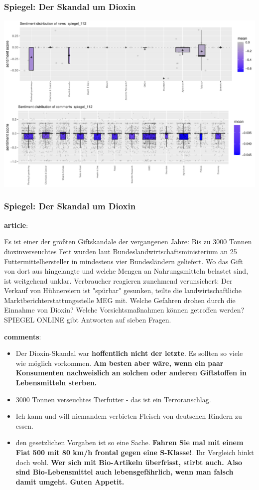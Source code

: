 \documentclass{tum-presentation}
\begin{document}
\begin{frame}
  \frametitle{Spiegel: Der Skandal um Dioxin }
  \includegraphics[width =0.65 \textwidth]{figures/boxplot_spiegel_112.pdf}
  
\end{frame}
\begin{frame}
  \frametitle{ Spiegel: Der Skandal um Dioxin }
  \begin{description}
    \item \textbf{article}:
    \item Es ist einer der größten Giftskandale der vergangenen Jahre: Bis zu 3000 Tonnen dioxinverseuchtes Fett wurden laut Bundeslandwirtschaftsministerium an 25 Futtermittelhersteller in mindestens vier Bundesländern geliefert. Wo das Gift von dort aus hingelangte und welche Mengen an Nahrungsmitteln belastet sind, ist weitgehend unklar. Verbraucher reagieren zunehmend verunsichert: Der Verkauf von Hühnereiern ist "spürbar" gesunken, teilte die landwirtschaftliche Marktberichterstattungsstelle MEG mit. Welche Gefahren drohen durch die Einnahme von Dioxin? Welche Vorsichtsmaßnahmen können getroffen werden? SPIEGEL ONLINE gibt Antworten auf sieben Fragen.
    \item \textbf{comments}:
    \item  \begin{itemize}
      \item  Der Dioxin-Skandal war  \textbf{hoffentlich nicht der letzte}. Es sollten so viele wie möglich vorkommen.  \textbf{Am besten aber wäre, wenn ein paar Konsumenten nachweislich an solchen oder anderen Giftstoffen in Lebensmitteln sterben.}
      \item 3000 Tonnen verseuchtes Tierfutter - das ist ein Terroranschlag.
      \item Ich kann und will niemandem verbieten Fleisch von deutschen Rindern zu essen.
      \item den gesetzlichen Vorgaben ist so eine Sache.  \textbf{Fahren Sie mal mit einem Fiat 500 mit 80 km/h frontal gegen eine S-Klasse!}. Ihr Vergleich hinkt doch wohl. \textbf{ Wer sich mit Bio-Artikeln überfrisst, stirbt auch. Also sind Bio-Lebensmittel auch lebensgefährlich, wenn man falsch damit umgeht. Guten Appetit.}
      
    \end{itemize}
   \end{description}
\end{frame}
\end{document}
